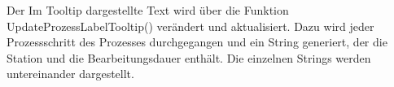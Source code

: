 Der Im Tooltip dargestellte Text wird über die Funktion UpdateProzessLabelTooltip() verändert und aktualisiert. Dazu wird jeder Prozessschritt des Prozesses durchgegangen und ein String generiert, der die Station und die Bearbeitungsdauer enthält. Die einzelnen Strings werden untereinander dargestellt. 

